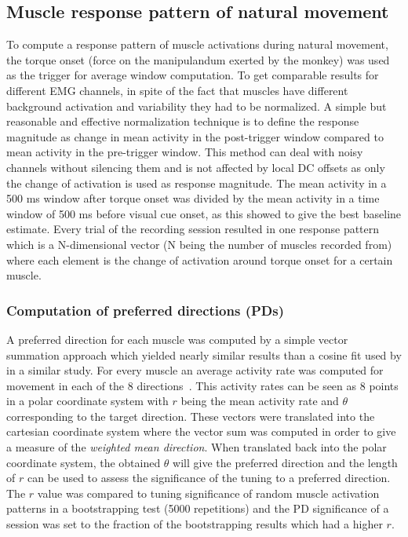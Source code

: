 % 
\subsection{Muscle response pattern of natural movement} %
\label{sg:sub:natural_movement}


To compute a response pattern of muscle activations during natural movement, the torque onset (force on the manipulandum exerted by the monkey) was used as the trigger for average window computation. To get comparable results for different EMG channels, in spite of the fact that muscles have different background activation and variability they had to be normalized. A simple but reasonable and effective normalization technique is to define the response magnitude as change in mean activity in the post-trigger window compared to mean activity in the pre-trigger window. This method can deal with noisy channels without silencing them and is not affected by local DC offsets as only the change of activation is used as response magnitude. The mean activity in a 500 ms window after torque onset was divided by the mean activity in a time window of 500 ms before visual cue onset, as this showed to give the best baseline estimate. Every trial of the recording session resulted in one response pattern which is a N-dimensional vector (N being the number of muscles recorded from) where each element is the change of activation around torque onset for a certain muscle.

\subsubsection{Computation of preferred directions (PDs)} %
\label{sg:ssub:pds}

A preferred direction for each muscle was computed by a simple vector summation approach which yielded nearly similar results than a cosine fit used by \citet{Georgopoulos:1982p4165} in a similar study. For every muscle an average activity rate was computed for movement in each of the 8 directions~. This activity rates can be seen as 8 points in a polar coordinate system with $r$ being the mean activity rate and $\theta$ corresponding to the target direction. These vectors were translated into the cartesian coordinate system where the vector sum was computed in order to give a measure of the \emph{weighted mean direction}. When translated back into the polar coordinate system, the obtained $\theta$ will give the preferred direction and the length of $r$ can be used to assess the significance of the tuning to a preferred direction. The $r$ value was compared to tuning significance of random muscle activation patterns in a bootstrapping test (5000 repetitions) and the PD significance of a session was set to the fraction of the bootstrapping results which had a higher $r$. 


